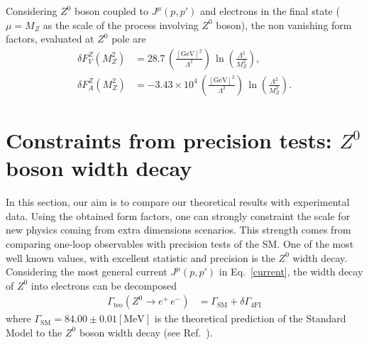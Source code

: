 \documentclass[twocolumn,showpacs,showkeys,prd,superscriptaddress]{revtex4-1}
\begin{document}
Considering $Z^0$ boson coupled to $J^\mu(p,p')$ and electrons in the final state ($\mu = M_Z$ as the scale of the process involving $Z^0$ boson), the non vanishing form factors, evaluated at $Z^0$ pole are  
\begin{align}
  \delta F_V^Z(M_Z^2) &= 28.7\,\left(\frac{[\text{GeV}]^2}{\Lambda^2}\right)\,\ln\left(\frac{\Lambda^2}{M_Z^2}\right), \\
  \delta F_A^Z(M_Z^2) &= -3.43\times10^4\,\left(\frac{[\text{GeV}]^2}{\Lambda^2}\right)\,\ln\left(\frac{\Lambda^2}{M_Z^2}\right).
\end{align}
% 

%

\section{\label{sec:constraints}Constraints from precision tests: $Z^0$ boson width decay}

In this section, our aim is to compare our theoretical results with experimental data. Using the obtained form factors, one can strongly constraint the scale for new physics coming from extra dimensions scenarios. This strength comes from comparing one-loop observables with precision tests of the SM. One of the most well known values, with excellent statistic and precision is the $Z^0$ width decay. Considering the most general current $J^\mu(p,p')$ in Eq.~\eqref{current}, the width decay of $Z^0$ into electrons can be decomposed
\begin{align}
  \Gamma_{\text{teo}}\left(Z^0\rightarrow e^+\,e^-\right) &= \Gamma_{\text{SM}} + \delta\Gamma_{\text{4FI}} 
\end{align}
where $\Gamma_{\text{SM}} = 84.00\pm0.01 [\text{MeV}]$ is the theoretical prediction of the Standard Model to the $Z^0$ boson width decay (see Ref.~\cite{Beringer:1900zz}).
\end{document}
